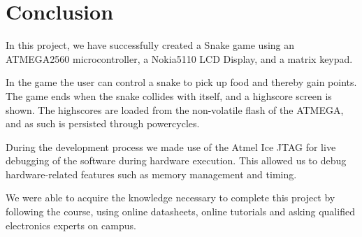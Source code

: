 \section{Conclusion}
In this project, we have successfully created a Snake game using an ATMEGA2560 microcontroller, a Nokia5110 LCD Display, and a matrix keypad.

In the game the user can control a snake to pick up food and thereby gain points. The game ends when the snake collides with itself, and a highscore screen is shown. The highscores are loaded from the non-volatile flash of the ATMEGA, and as such is persisted through powercycles.

During the development process we made use of the Atmel Ice JTAG for live debugging of the software during hardware execution. This allowed us to debug hardware-related features such as memory management and timing.

We were able to acquire the knowledge necessary to complete this project by following the course, using online datasheets, online tutorials and asking qualified electronics experts on campus.